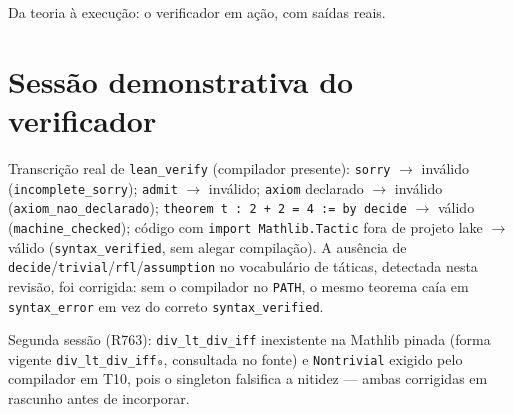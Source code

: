 Da teoria à execução: o verificador em ação, com saídas reais.
\section{Sessão demonstrativa do verificador}
Transcrição real de \texttt{lean\_verify} (compilador presente): \texttt{sorry} $\to$ inválido (\texttt{incomplete\_sorry}); \texttt{admit} $\to$ inválido; \texttt{axiom} declarado $\to$ inválido (\texttt{axiom\_nao\_declarado}); \texttt{theorem t : 2 + 2 = 4 := by decide} $\to$ válido (\texttt{machine\_checked}); código com \texttt{import Mathlib.Tactic} fora de projeto lake $\to$ válido (\texttt{syntax\_verified}, sem alegar compilação). A ausência de \texttt{decide}/\texttt{trivial}/\texttt{rfl}/\texttt{assumption} no vocabulário de táticas, detectada nesta revisão, foi corrigida: sem o compilador no \texttt{PATH}, o mesmo teorema caía em \texttt{syntax\_error} em vez do correto \texttt{syntax\_verified}.
\par Segunda sessão (R763): \texttt{div\_lt\_div\_iff} inexistente na Mathlib pinada (forma vigente \texttt{div\_lt\_div\_iff₀}, consultada no fonte) e \texttt{Nontrivial} exigido pelo compilador em T10, pois o singleton falsifica a nitidez --- ambas corrigidas em rascunho antes de incorporar.
